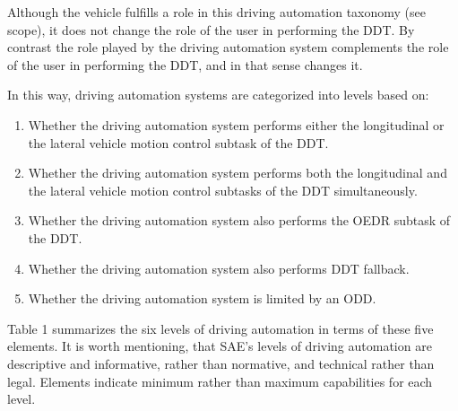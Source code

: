 Although the vehicle fulfills a role in this driving automation taxonomy (see scope), it does not change the role of the user in performing the DDT. 
By contrast the role played by the driving automation system complements the role of the user in performing the DDT, and in that sense changes it.

In this way, driving automation systems are categorized into levels based on:

\begin{enumerate}

  \item Whether the driving automation system performs either the longitudinal or the lateral vehicle motion control subtask of the DDT.
  \item Whether the driving automation system performs both the longitudinal and the lateral vehicle motion control subtasks of the DDT simultaneously.
  \item Whether the driving automation system also performs the OEDR subtask of the DDT.
  \item Whether the driving automation system also performs DDT fallback.
  \item Whether the driving automation system is limited by an ODD. 

\end{enumerate}

Table 1 summarizes the six levels of driving automation in terms of these five elements.
It is worth mentioning, that SAE’s levels of driving automation are descriptive and informative, rather than normative, and technical rather than legal.
Elements indicate minimum rather than maximum capabilities for each level.

